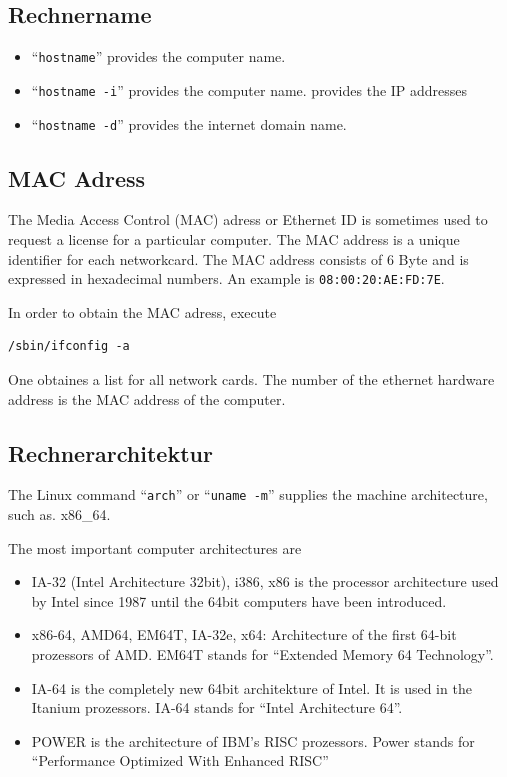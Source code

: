 \documentclass[a4paper,10pt]{report}
\newcommand{\mytt}[1]{{\tt #1}}
\begin{document}
\subsection{Rechnername}
\begin{itemize}
\item  ``\mytt{hostname}'' provides the computer name.
\item  ``\mytt{hostname -i}'' provides the computer name. provides the IP addresses
\item  ``\mytt{hostname -d}'' provides the internet domain name.
\end{itemize}

\subsection{MAC Adress}

The Media Access Control (MAC) adress or Ethernet ID is sometimes used
to request a license for a particular computer. The MAC address is a
unique identifier for each networkcard. The MAC address consists of 6
Byte and is expressed in hexadecimal numbers.  An example is
\mytt{08:00:20:AE:FD:7E}.

In order to obtain the  MAC adress, execute
\begin{verbatim}
/sbin/ifconfig -a
\end{verbatim}
One obtaines a list for all network cards. The number of the ethernet
hardware address is the MAC address of the computer.

\subsection{Rechnerarchitektur}
The Linux command ``\mytt{arch}'' or ``\mytt{uname -m}'' supplies the
machine architecture, such as. x86\_64.

The most important computer architectures are
\begin{itemize}
\item IA-32 (Intel Architecture 32bit), i386, x86 is the processor
architecture used by Intel since 1987 until the 64bit computers have
been introduced.
\item x86-64, AMD64, EM64T, IA-32e, x64:  Architecture of the first 64-bit
prozessors of  AMD. EM64T stands for ``Extended Memory 64 Technology''.
\item IA-64 is the completely new 64bit architekture of Intel. It is
used in the Itanium prozessors. IA-64 stands for ``Intel Architecture
64''.
\item POWER is the architecture of IBM's RISC prozessors.
Power stands for ``Performance Optimized With Enhanced RISC''
\end{itemize}
\end{document}
